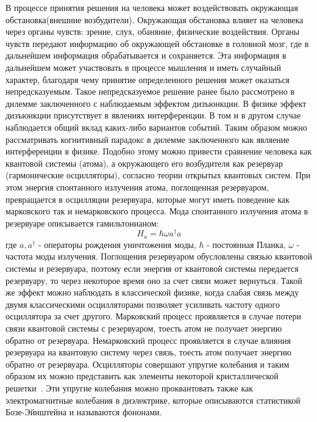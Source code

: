 В процессе принятия решения на человека может воздействовать окружающая обстановка(внешние возбудители).
Окружающая обстановка влияет на человека через органы чувств: зрение, слух, обаняние, физические воздействия.
Органы чувств передают информацию об окружающей обстановке в головной мозг, где в дальнейшем
информация обрабатывается и сохраняется.
Эта информация в дальнейшем может участвовать в процессе мышления и иметь случайный характер, благодаря
чему принятие определенного решения может оказаться непредсказуемым.
Такое непредсказуемое решение ранее было рассмотрено в дилемме заключенного с наблюдаемым эффектом дизъюнкции.
В физике эффект дизъюнкции присутствует в явлениях интерференции.
В том и в другом случае наблюдается общий вклад каких-либо вариантов событий.
Таким образом можно рассматривать когнитивный парадокс в дилемме заключенного как являение интерференции в физике.
Подобно этому можно привести сравнение человека как квантовой системы (атома), а окружающего его
возбудителя как резервуар (гармонические осцилляторы), согласно теории открытых квантовых систем.
При этом энергия спонтанного излучения атома, поглощенная резервуаром, превращается в осцилляции
резервуара, которые могут иметь поведение как марковского так и немарковского процесса.
Мода спонтанного излучения атома в резервуаре описывается гамильтонианом:
\begin{equation}
    H_{a} = \hbar \omega a^{\dagger} a
\end{equation}
где $a, a^{\dagger}$ - операторы рождения уничтожения моды, $\hbar$ - постоянная Планка, $\omega$ -
частота моды излучения.
Поглощения резервуаром обусловлены связью квантовой системы и резервуара, поэтому если энергия от
квантовой системы передается резервуару, то через некоторое время оно за счет связи может вернуться.
Такой же эффект можно наблюдать в классической физике, когда слабая связь между двумя классическими
осцилляторами позволяет усиливать частоту одного осциллятора за счет другого.
Марковский процесс проявляется в случае потери связи квантовой системы с резервуаром, тоесть атом
не получает энергию обратно от резервуара.
Немарковский процесс проявляется в случае влияния резервуара на квантовую систему через связь, тоесть
атом получает энергию обратно от резервуара.
Осцилляторы совершают упругие колебания и таким образом их можно представить как элементы некоторой
кристаллической решетки~\citep{barnett2002methods}.
Эти упругие колебания можно проквантовать также как электромагнитные колебания в диэлектрике, которые
описываются статистикой Бозе-Эйнштейна и называются фононами.
